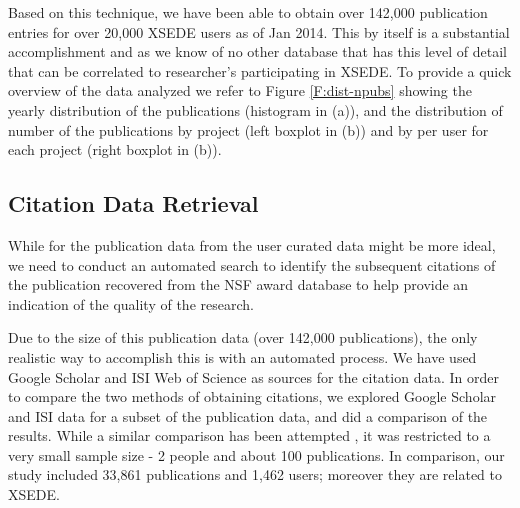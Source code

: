 \documentclass{sig-alternate}
\begin{document}
Based on this technique, we have been able to obtain over 142,000 publication entries for over 20,000 XSEDE users as of Jan 2014.  This by itself is a substantial accomplishment and as we know of no other database that has this level of detail that can be correlated to researcher's participating in XSEDE. To provide a quick overview of the data analyzed we refer to Figure \ref{F:dist-npubs} showing the yearly distribution of the publications (histogram in (a)), and the distribution of number of the publications by project (left boxplot in (b)) and by per user for each project (right boxplot in (b)). 
 
\subsection{Citation Data Retrieval} 
 
While for the publication data from the user curated data might be more ideal, we need to conduct an automated search to identify the subsequent citations of the publication recovered from the NSF award database to help provide an indication of the quality of the research. 

Due to the size of this publication data (over 142,000 publications), the only realistic way to accomplish this is with an automated process. We have used Google Scholar and ISI Web of Science as sources for the citation data. In order to compare the two methods of obtaining citations, we explored Google Scholar and ISI data for a subset of the publication data, and did a comparison of the results. While a similar comparison has been attempted \cite{yang2006citation}, it was restricted to a very small sample size - 2 people and about 100 publications. In comparison, our study included 33,861 publications and 1,462 users; moreover they are related to XSEDE.
\end{document}
